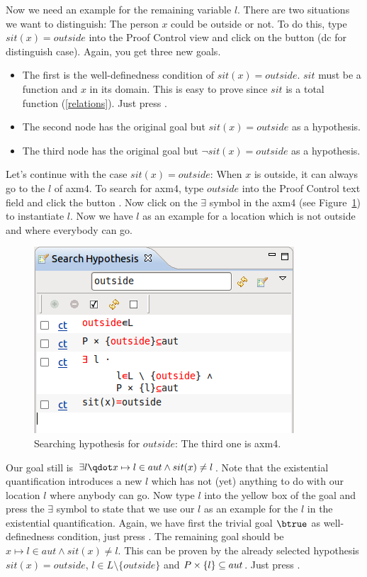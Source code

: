 Now we need an example for the remaining variable $l$.
There are two situations we want to distinguish: The person $x$ could be outside or not.
To do this, type $sit(x) = outside$ into the \textsf{Proof Control} view and click on the button  (\textsf{dc} for distinguish case).
Again, you get three new goals.
\begin{itemize}
\item The first is the well-definedness condition of $sit(x) = outside$. $sit$ must be a function and $x$ in its domain.
  This is easy to prove since $sit$ is a total function (\ref{relations}). Just press .
\item The second node has the original goal but $sit(x) = outside$ as a hypothesis.
\item The third node has the original goal but $\lnot sit(x) = outside$ as a hypothesis.
\end{itemize}
Let's continue with the case $sit(x)=outside$: When $x$ is outside, it can always go to the $l$ of \textsf{axm4}.
To search for \textsf{axm4}, type $outside$ into the \textsf{Proof Control} text field and click the button . Now click on the $\exists$ symbol in the \textsf{axm4} (see Figure~\ref{fig_tut_10_search_hypotheses})
to instantiate $l$.
Now we have $l$ as an example for a location which is not outside and where everybody can go.
\begin{figure}[!ht]
  \begin{center}
    \includegraphics{img/tutorial/tut_10_search_hyp.png}
    \caption{Searching hypothesis for $outside$: The third one is \textsf{axm4}.}
    \label{fig_tut_10_search_hypotheses}
  \end{center}
\end{figure}
Our goal still is $\exists l\qdot x\mapsto l\in aut \land sit(x)\neq l$.
Note that the existential quantification introduces a new $l$ which has not (yet) anything to do with
 our location $l$ where anybody can go.
Now type $l$ into the yellow box of the goal and press the $\exists$ symbol to state that we use our $l$ as
  an example for the $l$ in the existential quantification.
Again, we have first the trivial goal $\btrue$ as well-definedness condition, just press .
The remaining goal should be $x\mapsto l\in aut \land sit(x)\neq l$.
This can be proven by the already selected hypothesis $sit(x)=outside$, $l\in L\setminus\{outside\}$ and $P\mathbin\times\{l\}\subseteq aut$. Just
  press .

